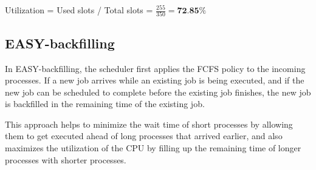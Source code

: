 \documentclass[11pt]{article}
\begin{document}
\begin{center}
Utilization = Used slots / Total slots = $\frac{255}{350} = \textbf{72.85\%}$
\end{center}

\newpage

\hypertarget{EASY-backfilling}{%
\subsection{EASY-backfilling}\label{EASY-backfilling}}

 In EASY-backfilling, the scheduler first applies the FCFS policy to the incoming processes. If a new job arrives while an existing job is being executed, and if the new job can be scheduled to complete before the existing job finishes, the new job is backfilled in the remaining time of the existing job.

This approach helps to minimize the wait time of short processes by allowing them to get executed ahead of long processes that arrived earlier, and also maximizes the utilization of the CPU by filling up the remaining time of longer processes with shorter processes.
\end{document}
